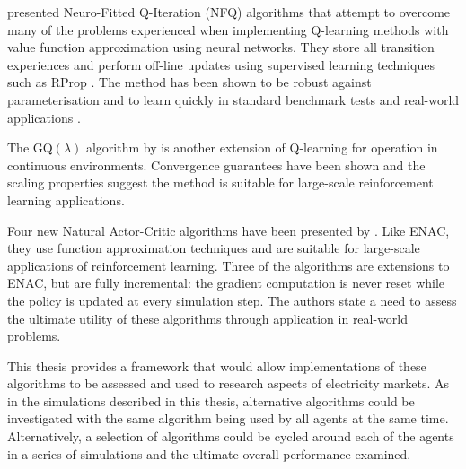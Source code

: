  presented Neuro-Fitted Q-Iteration (NFQ)
algorithms that attempt to overcome many of the problems experienced when implementing
Q-learning methods with value function approximation using neural networks.
They store all transition experiences and perform off-line updates using
supervised learning techniques such as RProp \cite{riedmiller93}.  The method
has been shown to be robust against parameterisation and to learn quickly in
standard benchmark tests and real-world applications \cite{kietzmann09}.

The GQ$(\lambda)$ algorithm by  is another extension of Q-learning
for operation in continuous environments.  Convergence guarantees have been
shown and the scaling properties suggest the method is suitable for large-scale
reinforcement learning applications.

Four new Natural Actor-Critic algorithms have been presented by
. Like ENAC, they use function approximation techniques and
are suitable for large-scale applications of reinforcement learning.  Three of
the algorithms are extensions to ENAC, but are fully incremental: the gradient
computation is never reset while the policy is updated at every simulation step.
 The authors state a need to assess the ultimate utility of these algorithms
through application in real-world problems.

This thesis provides a framework that would allow implementations of these
algorithms to be assessed and used to research aspects of electricity
markets.  As in the simulations described in this thesis, alternative algorithms
could be investigated with the same algorithm being used by all agents at the
same time.  Alternatively, a selection of algorithms could be cycled
around each of the agents in a series of simulations and the ultimate overall
performance examined.

